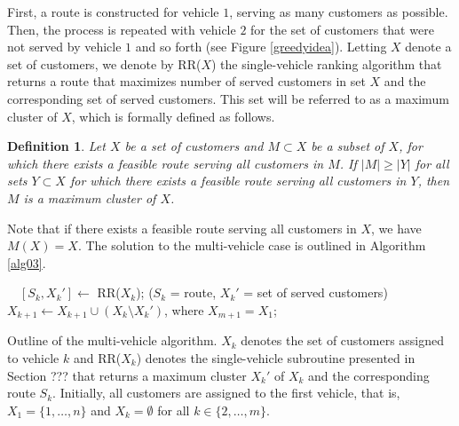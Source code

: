\documentclass[dissertation,draft*]{aaltoseries}
\newtheorem*{definition}{Definition}
\begin{document}
First, a route is constructed for vehicle $1$, serving as many 
customers as possible. Then, the process is repeated with vehicle $2$ for the set of customers
that were not served by vehicle $1$ and so forth (see Figure \ref{greedyidea}). 
Letting $X$ denote a
set of customers, we denote by RR($X$) the single-vehicle ranking algorithm that returns a route 
that maximizes number of served customers in set $X$ and the corresponding set of served customers.
This set will be referred to as a maximum cluster of $X$, which is formally defined as follows.
\begin{definition}
Let $X$ be a set of customers and $M \subset X$ be a subset of $X$, for which there exists a feasible 
route serving all customers in $M$. If $|M| \geq |Y|$ for all sets $Y \subset X$
for which there exists a feasible route serving all customers in $Y$, then $M$ is a \emph{maximum cluster} of $X$.
\end{definition}
Note that if there exists a feasible route serving all customers in $X$, we have $M(X) = X$.
The solution to the multi-vehicle case is outlined in Algorithm \ref{alg03}.

\begin{algorithm}
\begin{algorithmic}
\STATE \ \ $[S_k,X_k'] \leftarrow $ RR($X_k$); \hfill ($S_k$ = route, $X_k'$ = set of served customers)
\STATE \ \ $X_{k+1}  \leftarrow X_{k+1} \cup (X_k \setminus X_k')$, where $X_{m+1} = X_1$;
\ENDFOR
\end{algorithmic}
\caption{Outline of the multi-vehicle algorithm. $X_k$ denotes the set of customers assigned 
to vehicle $k$ and RR($X_k$) denotes the single-vehicle 
subroutine presented in Section ??? that returns
a maximum cluster $X_k'$ of $X_k$ and the corresponding route $S_k$. 
Initially, all customers are assigned to the first vehicle, that is, $X_1 = \{1,\ldots,n\}$ and $X_k = \emptyset$ for all $k \in \{2,\ldots,m\}$.}
\label{alg03}
\end{algorithm}
\end{document}
